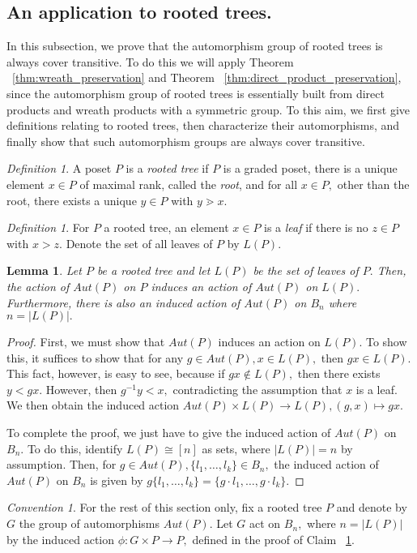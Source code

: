 \documentclass{amsart}
\newtheorem{lem}[thm]{Lemma}
\theoremstyle{remark}
\newtheorem{defn}[thm]{Definition}
\newtheorem{convention}[thm]{Convention}
\newcommand\ssec{\subsection}
\begin{document}
\ssec{An application to rooted trees.}
In this subsection, we prove that the automorphism group of rooted trees is always cover transitive. To do this we will apply Theorem ~\ref{thm:wreath_preservation} and Theorem ~\ref{thm:direct_product_preservation}, since the automorphism group of rooted trees is essentially built from direct products and wreath products with a symmetric group. To this aim, we first give definitions relating to rooted trees, then characterize their automorphisms, and finally show that such automorphism groups are always cover transitive.

\begin{defn}
A poset $P$ is a {\it rooted tree} if $P$ is a graded poset, there is a unique element $x \in P$ of maximal rank, called the {\it root}, and for all $x \in P,$ other than the root, there exists a unique $y \in P$ with $y \gtrdot x.$
\end{defn}

\begin{defn}
For $P$ a rooted tree, an element $x \in P$ is a {\it leaf} if there is no $z \in P$ with $x > z.$ Denote the set of all leaves of $P$ by $L(P).$
\end{defn}

\begin{lem}
\label{lem:induced_tree_action}
Let $P$ be a rooted tree and let $L(P)$ be the set of leaves of $P.$ Then, the action of $Aut(P)$ on $P$ induces an action of $Aut(P)$ on $L(P).$ Furthermore, there is also an induced action of $Aut(P)$ on $B_n$ where $n = |L(P)|.$ 
\end{lem}
\begin{proof}
First, we must show that $Aut(P)$ induces an action on $L(P).$ To show this, it suffices to show that for any $g \in Aut(P),x \in L(P),$ then $gx \in L(P).$ This fact, however, is easy to see, because if $gx \notin L(P),$ then there exists $y < gx.$ However, then $g^{-1}y < x,$ contradicting the assumption that $x$ is a leaf. We then obtain the induced action $Aut(P)\times L(P) \rightarrow L(P),(g,x)\mapsto gx.$

To complete the proof, we just have to give the induced action of $Aut(P)$ on $B_n.$ To do this, identify $L(P) \cong [n]$ as sets, where $|L(P)| = n$ by assumption. Then, for $g \in Aut(P),\{l_1,\ldots, l_k\} \in B_n,$ the induced action of $Aut(P)$ on $B_n$ is given by $g\{l_1,\ldots, l_k\} = \{g\cdot l_1,\ldots, g\cdot l_k\}.$
\end{proof}

\begin{convention}
For the rest of this section only, fix a rooted tree $P$ and denote by $G$ the group of automorphisms $Aut(P).$ Let $G$ act on $B_n,$ where $n = |L(P)|$ by the induced action $\phi:G \times P \rightarrow P,$ defined in the proof of Claim ~\ref{lem:induced_tree_action}.
\end{convention}
\end{document}
